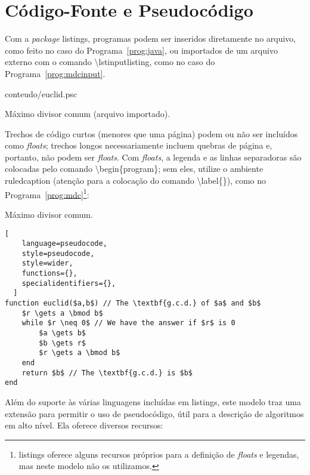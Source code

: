 \chapter{Código-Fonte e Pseudocódigo}
\label{ap:pseudocode}

Com a \textit{package} \textsf{listings}, programas podem ser inseridos
diretamente no arquivo, como feito no caso do Programa~\ref{prog:java},
ou importados de um arquivo externo com o comando
\textsf{\textbackslash{}lstinputlisting}, como no caso
do Programa~\ref{prog:mdcinput}.

\begin{program}
  
  {conteudo/euclid.psc}

  \caption{Máximo divisor comum (arquivo importado).}
  \label{prog:mdcinput}
\end{program}

Trechos de código curtos (menores que uma página) podem ou não ser
incluídos como \textit{floats}; trechos longos necessariamente incluem
quebras de página e, portanto, não podem ser \textit{floats}. Com
\textit{floats}, a legenda e as linhas separadoras são colocadas pelo
comando \textsf{\textbackslash{}begin\{program\}}; sem eles, utilize
o ambiente \textsf{ruledcaption} (atenção para a colocação do comando
\textsf{\textbackslash{}label\{\}}), como no Programa~\ref{prog:mdc}\footnote{
\textsf{listings} oferece alguns recursos próprios para a definição
de \textit{floats} e legendas, mas neste modelo não os utilizamos.}:

\begin{ruledcaption}{Máximo divisor comum.\label{prog:mdc}}
  \begin{lstlisting}[
    language=pseudocode,
    style=pseudocode,
    style=wider,
    functions={},
    specialidentifiers={},
  ]
function euclid($a,b$) // The \textbf{g.c.d.} of $a$ and $b$
	$r \gets a \bmod b$
	while $r \neq 0$ // We have the answer if $r$ is 0
		$a \gets b$
		$b \gets r$
		$r \gets a \bmod b$
	end
	return $b$ // The \textbf{g.c.d.} is $b$
end
  \end{lstlisting}
\end{ruledcaption}

Além do suporte às várias linguagens incluídas em \textsf{listings},
este modelo traz uma extensão para permitir o uso de pseudocódigo,
útil para a descrição de algoritmos em alto nível. Ela oferece
diversos recursos:

